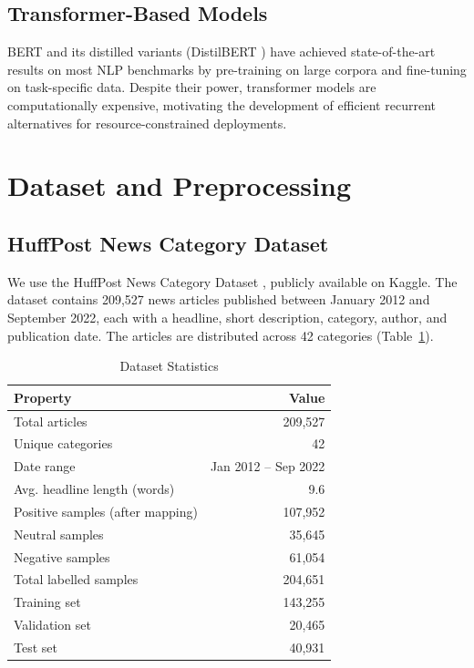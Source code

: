 \documentclass[conference]{IEEEtran}
\begin{document}
\subsection{Transformer-Based Models}
BERT \cite{devlin2019bert} and its distilled variants (DistilBERT
\cite{sanh2019distilbert}) have achieved state-of-the-art results on
most NLP benchmarks by pre-training on large corpora and fine-tuning
on task-specific data. Despite their power, transformer models are
computationally expensive, motivating the development of efficient
recurrent alternatives for resource-constrained deployments.

\section{Dataset and Preprocessing}
\label{sec:dataset}

\subsection{HuffPost News Category Dataset}
We use the HuffPost News Category Dataset
\cite{misra2022news}, publicly available on Kaggle. The dataset
contains 209,527 news articles published between January 2012 and
September 2022, each with a headline, short description, category,
author, and publication date. The articles are distributed across 42
categories (Table~\ref{tab:dataset}).

\begin{table}[h]
\caption{Dataset Statistics}
\label{tab:dataset}
\centering
\begin{tabular}{lr}
\toprule
\textbf{Property} & \textbf{Value} \\
\midrule
Total articles & 209,527 \\
Unique categories & 42 \\
Date range & Jan 2012 – Sep 2022 \\
Avg. headline length (words) & 9.6 \\
Positive samples (after mapping) & 107,952 \\
Neutral samples & 35,645 \\
Negative samples & 61,054 \\
Total labelled samples & 204,651 \\
Training set & 143,255 \\
Validation set & 20,465 \\
Test set & 40,931 \\
\bottomrule
\end{tabular}
\end{table}
\end{document}
